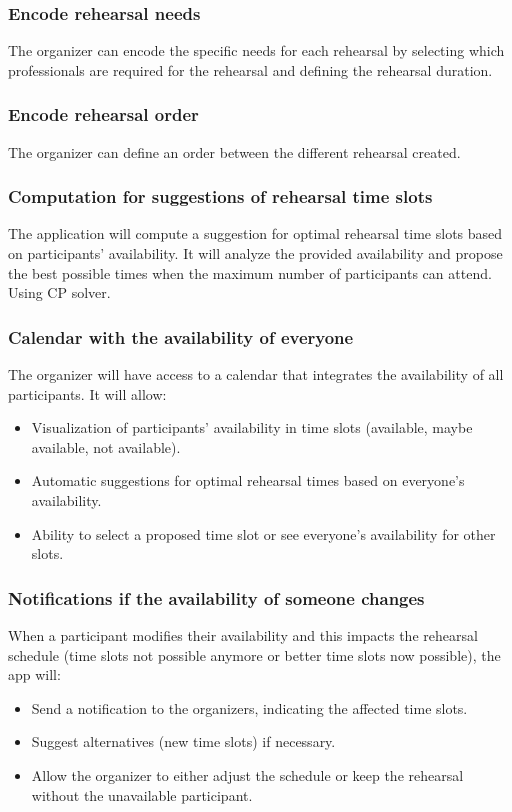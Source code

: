 \documentclass[11pt]{article}
\begin{document}
\subsubsection{Encode rehearsal needs}
The organizer can encode the specific needs for each rehearsal by selecting which professionals are required for the rehearsal and defining the rehearsal duration. 

\subsubsection{Encode rehearsal order}
The organizer can define an order between the different rehearsal created.

\subsubsection{Computation for suggestions of rehearsal time slots} 
The application will compute a suggestion for optimal rehearsal time slots based on participants' availability. It will analyze the provided availability and propose the best possible times when the maximum number of participants can attend. Using CP solver.

\subsubsection{Calendar with the availability of everyone}
The organizer will have access to a calendar that integrates the availability of all participants. It will allow:
\begin{itemize}
    \item Visualization of participants' availability in time slots (available, maybe available, not available).
    \item Automatic suggestions for optimal rehearsal times based on everyone's availability.
    \item Ability to select a proposed time slot or see everyone's availability for other slots.
\end{itemize}

\subsubsection{Notifications if the availability of someone changes}
When a participant modifies their availability and this impacts the rehearsal schedule (time slots not possible anymore or better time slots now possible), the app will:
\begin{itemize}
    \item Send a notification to the organizers, indicating the affected time slots.
    \item Suggest alternatives (new time slots) if necessary.
    \item Allow the organizer to either adjust the schedule or keep the rehearsal without the unavailable participant.
\end{itemize}
\end{document}
